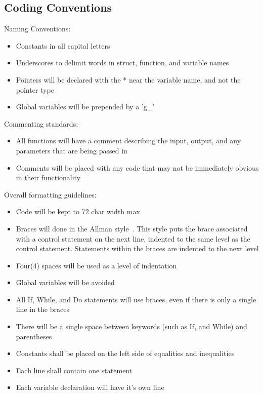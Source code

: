 \documentclass[letterpaper]{article}
\begin{document}
\subsection{Coding Conventions}
\label{sec:policies_conventions}

Naming Conventions:\\
    \begin{itemize}
    \item Constants in all capital letters
    \item Underscores to delimit words in struct, function,
          and variable names
    \item Pointers will be declared with the * near the
          variable name, and not the pointer type
    \item Global variables will be prepended by a 'g\_'
    \end{itemize}
Commenting standards:\\
    \begin{itemize}
    \item All functions will have a comment describing the
          input, output, and any parameters that are being
          passed in
    \item Comments will be placed with any code that may not be
          immediately obvious in their functionality
    \end{itemize}
Overall formatting guidelines:
    \begin{itemize}
    \item Code will be kept to 72 char width max
    \item Braces will done in the Allman style~\cite{allman}.
          This style puts the brace associated with a control 
          statement on the next line, indented to the same 
          level as the control statement. Statements within
          the braces are indented to the next level
    \item Four(4) spaces will be used as a level of indentation
    \item Global variables will be avoided
    \item All If, While, and Do statements will use braces,
          even if there is only a single line in the braces
    \item There will be a single space between keywords 
          (such as If, and While) and parentheses
    \item Constants shall be placed on the left side of 
          equalities and inequalities
    \item Each line shall contain one statement
    \item Each variable declaration will have it's own line
    \end{itemize}
    
\end{document}
